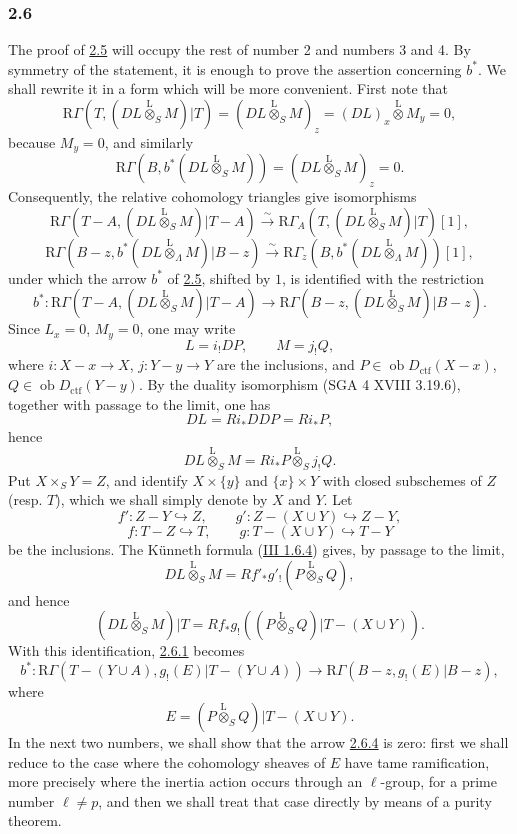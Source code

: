 \documentclass[11pt]{article}
\providecommand{\lten}{\overset{\mathrm L}{\otimes}}
\providecommand{\Ob}{\operatorname{ob}}
\providecommand{\lten}{\overset{\mathrm L}{\otimes}}
\providecommand{\lten}{\overset{\mathrm L}{\otimes}}
\providecommand{\Ob}{\operatorname{ob}}
\providecommand{\lten}{\overset{\mathrm L}{\otimes}}
\providecommand{\lten}{\overset{\mathrm L}{\otimes}}
\providecommand{\Ob}{\operatorname{Ob}}
\providecommand{\lten}{\overset{\mathrm L}{\otimes}}
\providecommand{\Ob}{\operatorname{ob}}
\providecommand{\Ob}{\operatorname{Ob}}
\providecommand{\lten}{\overset{\mathrm L}{\otimes}}
\begin{document}
\subsubsection*{2.6}\label{sga5:IIIB:subsubsection:2.6}
The proof of \hyperref[sga5:IIIB:proposition:2.5]{2.5} will occupy the rest of number 2 and numbers 3 and 4. By symmetry of the statement, it is enough to prove the assertion concerning $b^*$. We shall rewrite it in a form which will be more convenient. First note that
\[
\mathrm R\Gamma(T,(DL\lten_SM)|T)
 =(DL\lten_SM)_z
 =(DL)_x\lten M_y=0,
\]
because $M_y=0$, and similarly
\[
\mathrm R\Gamma(B,b^*(DL\lten_SM))
 =(DL\lten_SM)_z=0.
\]
Consequently, the relative cohomology triangles give isomorphisms
\[
\mathrm R\Gamma(T-A,(DL\lten_SM)|T-A)
 \xrightarrow{\sim}
\mathrm R\Gamma_A(T,(DL\lten_SM)|T)[1],
\]
\[
\mathrm R\Gamma(B-z,b^*(DL\lten_{\Lambda}M)|B-z)
 \xrightarrow{\sim}
\mathrm R\Gamma_z(B,b^*(DL\lten_{\Lambda}M))[1],
\]
under which the arrow $b^*$ of \hyperref[sga5:IIIB:proposition:2.5]{2.5}, shifted by $1$, is identified with the restriction
\begin{equation}
b^*:\mathrm R\Gamma(T-A,(DL\lten_SM)|T-A)
 \longrightarrow \mathrm R\Gamma(B-z,(DL\lten_SM)|B-z).
\tag{2.6.1}\label{sga5:IIIB:equation:2.6.1}
\end{equation}
Since $L_x=0$, $M_y=0$, one may write
\begin{equation}
L=i_!DP,\qquad M=j_!Q,
\tag{2.6.2}\label{sga5:IIIB:equation:2.6.2}
\end{equation}
where $i:X-x\to X$, $j:Y-y\to Y$ are the inclusions, and $P\in\Ob D_{\mathrm{ctf}}(X-x)$, $Q\in\Ob D_{\mathrm{ctf}}(Y-y)$. By the duality isomorphism (SGA 4 XVIII 3.19.6), together with passage to the limit, one has
\[
DL=Ri_*DDP=Ri_*P,
\]
hence
\[
DL\lten_SM=Ri_*P\lten_Sj_!Q.
\]
Put $X\times_SY=Z$, and identify $X\times\{y\}$ and $\{x\}\times Y$ with closed subschemes of $Z$ (resp. $T$), which we shall simply denote by $X$ and $Y$. Let
\[
f':Z-Y\hookrightarrow Z,\qquad
g':Z-(X\cup Y)\hookrightarrow Z-Y,
\]
\[
f:T-Z\hookrightarrow T,\qquad
g:T-(X\cup Y)\hookrightarrow T-Y
\]
be the inclusions. The Künneth formula (\hyperref[sga5:III:equation:1.6.4]{III 1.6.4}) gives, by passage to the limit,
\[
DL\lten_SM=Rf'_*g'_!(P\lten_SQ),
\]
and hence
\begin{equation}
(DL\lten_SM)|T=Rf_*g_!((P\lten_SQ)|T-(X\cup Y)).
\tag{2.6.3}\label{sga5:IIIB:equation:2.6.3}
\end{equation}
With this identification, \hyperref[sga5:IIIB:equation:2.6.1]{2.6.1} becomes
\begin{equation}
b^*:\mathrm R\Gamma(T-(Y\cup A),g_!(E)|T-(Y\cup A))
 \longrightarrow \mathrm R\Gamma(B-z,g_!(E)|B-z),
\tag{2.6.4}\label{sga5:IIIB:equation:2.6.4}
\end{equation}
where
\[
E=(P\lten_SQ)|T-(X\cup Y).
\]
In the next two numbers, we shall show that the arrow \hyperref[sga5:IIIB:equation:2.6.4]{2.6.4} is zero: first we shall reduce to the case where the cohomology sheaves of $E$ have tame ramification, more precisely where the inertia action occurs through an $\ell$-group, for a prime number $\ell\ne p$, and then we shall treat that case directly by means of a purity theorem.
\end{document}
